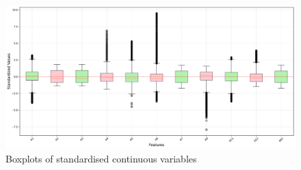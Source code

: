 \documentclass[11pt]{article}
\begin{document}
\begin{figure}
	\begin{minipage}[t]{\textwidth}
		\centering
		\includegraphics[width=\textwidth]{images/continuous_variables_boxplots_normalized.pdf}
		\caption{Boxplots of standardised continuous variables}
		\label{fig:outliers}
	\end{minipage}
\end{figure}
\end{document}
